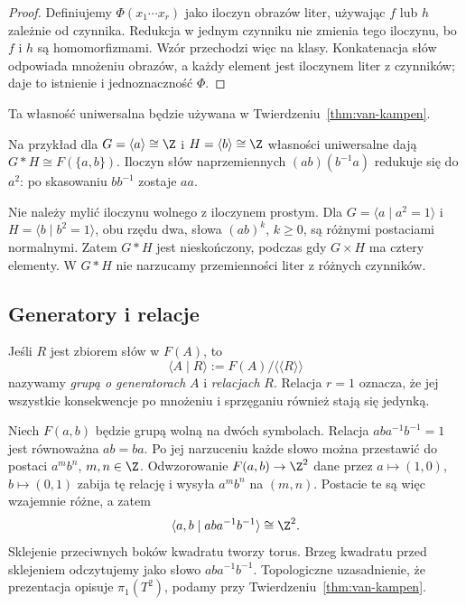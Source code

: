 \begin{proof}
Definiujemy $\Phi(x_1\cdots x_r)$ jako iloczyn obrazów liter,
używając $f$ lub $h$ zależnie od czynnika.
Redukcja w jednym czynniku nie zmienia tego iloczynu, bo
$f$ i $h$ są homomorfizmami. Wzór przechodzi więc na klasy.
Konkatenacja słów odpowiada mnożeniu obrazów, a każdy element
jest iloczynem liter z czynników; daje to istnienie i jednoznaczność $\Phi$.
\end{proof}

Ta własność uniwersalna będzie używana w
Twierdzeniu~\ref{thm:van-kampen}.

Na przykład dla $G=\langle a\rangle\cong\Z$
i $H=\langle b\rangle\cong\Z$ własności
uniwersalne dają $G*H\cong F(\{a,b\})$.
Iloczyn słów naprzemiennych
$(ab)(b^{-1}a)$ redukuje się do $a^2$:
po skasowaniu $bb^{-1}$ zostaje $aa$.

Nie należy mylić iloczynu wolnego z iloczynem prostym.
Dla $G=\langle a\mid a^2=1\rangle$ i
$H=\langle b\mid b^2=1\rangle$, obu rzędu dwa,
słowa $(ab)^k$, $k\geq0$, są różnymi postaciami normalnymi.
Zatem $G*H$ jest nieskończony, podczas gdy $G\times H$ ma
cztery elementy. W $G*H$ nie narzucamy przemienności liter
z różnych czynników.

\subsection*{Generatory i relacje}

\begin{definicja}
\label{def:prezentacja-grupy-5}
Jeśli $R$ jest zbiorem słów
w $F(A)$, to
\[
 \langle A\mid R\rangle
 :=F(A)/\langle\!\langle R\rangle\!\rangle
\]
nazywamy \emph{grupą o generatorach}
$A$ i \emph{relacjach} $R$.
Relacja $r=1$ oznacza, że jej
wszystkie konsekwencje po
mnożeniu i sprzęganiu również
stają się jedynką.
\end{definicja}

\begin{przyklad}
\label{prz:prezentacja-torusa-5}
Niech $F(a,b)$ będzie grupą wolną
na dwóch symbolach. Relacja
$aba^{-1}b^{-1}=1$
jest równoważna $ab=ba$.
Po jej narzuceniu każde słowo
można przestawić do postaci
$a^m b^n$, $m,n\in\Z$.
Odwzorowanie
$F(a,b)\to\Z^2$ dane przez
$a\mapsto(1,0)$,
$b\mapsto(0,1)$
zabija tę relację i wysyła
$a^m b^n$ na $(m,n)$.
Postacie te są więc wzajemnie
różne, a zatem
\[
 \langle a,b\mid aba^{-1}b^{-1}\rangle
 \cong\Z^2.
\]
Sklejenie przeciwnych boków kwadratu
tworzy torus. Brzeg kwadratu przed
sklejeniem odczytujemy jako słowo
$aba^{-1}b^{-1}$.
Topologiczne uzasadnienie, że
prezentacja opisuje $\pi_1(T^2)$,
podamy przy
Twierdzeniu~\ref{thm:van-kampen}.
\end{przyklad}


